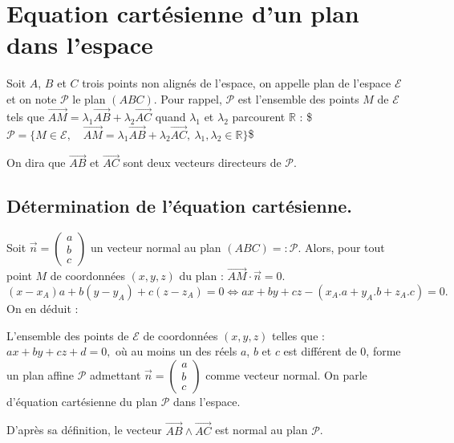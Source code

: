 \documentclass[letterpaper,10pt,english]{jupyterBook}
\begin{document}
\chapter{Equation cartésienne d’un plan dans l’espace}
\label{\detokenize{Part1/Cours:equation-cartesienne-d-un-plan-dans-l-espace}}
\sphinxAtStartPar
Soit \(A\), \(B\) et \(C\) trois points non alignés de l’espace, on appelle plan de l’espace \(\mathcal{E}\) et on note \(\mathcal{P}\) le plan \((ABC)\). Pour rappel,  \(\mathcal{P}\) est l’ensemble des points \(M\) de \(\mathcal{E}\) tels que \(\vec{AM} = \lambda_1 \vec{AB} + \lambda_2 \vec{AC}\) quand \(\lambda_1\) et \(\lambda_2\) parcourent \(\mathbb{R}\) :
\$\(
\mathcal{P} = \{M \in \mathcal{E},\quad \vec{AM} = \lambda_1 \vec{AB}+\lambda_2 \vec{AC},\ \lambda_1, \lambda_2 \in \mathbb{R}\}
\)\$

\sphinxAtStartPar
On dira que \(\vec{AB}\) et \(\vec{AC}\) sont deux vecteurs directeurs de \(\mathcal{P}\).


\section{Détermination de l’équation cartésienne.}
\label{\detokenize{Part1/Cours:determination-de-l-equation-cartesienne}}
\sphinxAtStartPar
Soit \(\vec{n}=\begin{pmatrix}a \\ b \\ c \end{pmatrix}\) un vecteur normal au plan \((ABC) = : \mathcal{P}\). Alors, pour tout point \(M\) de coordonnées \((x,y,z)\) du plan :
\(\vec{AM} \cdot \vec{n} = 0.\)
\(
(x-x_A)a + b(y-y_A) + c(z-z_A) = 0 \Leftrightarrow ax + by + cz - (x_A.a+y_A.b+z_A.c) = 0.
\)
On en déduit :

\sphinxAtStartPar
{}
L’ensemble des points de \(\mathcal{E}\) de coordonnées \((x,y,z)\) telles que :
\(ax+by + cz + d = 0,\)
où au moins un des réels \(a\), \(b\) et \(c\) est différent de 0, forme un plan affine \(\mathcal{P}\) admettant \(\vec{n}=\begin{pmatrix}a \\ b \\ c \end{pmatrix}\) comme vecteur normal. On parle d’équation cartésienne du plan \(\mathcal{P}\) dans l’espace.

\sphinxAtStartPar
{} D’après sa définition, le vecteur \(\vec{AB} \wedge \vec{AC}\) est normal au plan \(\mathcal{P}\).
\end{document}
